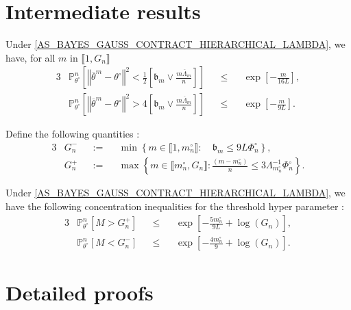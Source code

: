 \section{Intermediate results}

\begin{pr}\label{prB.1.1}
Under \textsc{\cref{AS_BAYES_GAUSS_CONTRACT_HIERARCHICAL_LAMBDA}}, we have, for all $m$ in $\llbracket 1, G_{n} \rrbracket$
\begin{alignat*}{3}
&\mathds{P}_{\theta^{\circ}}^{n}\left[\left\Vert \overline{\theta}^{m} - \theta^{\circ} \right\Vert^{2} < \frac{1}{2}\left[\mathfrak{b}_{m} \vee \frac{m \overline{\Lambda}_{m}}{n}\right]\right] &&\leq&& \exp\left[-\frac{m}{16 L}\right],\\
&\mathds{P}_{\theta^{\circ}}^{n}\left[\left\Vert \overline{\theta}^{m} - \theta^{\circ} \right\Vert^{2} > 4 \left[\mathfrak{b}_{m} \vee \frac{m \overline{\Lambda}_{m}}{n}\right]\right] &&\leq&& \exp\left[-\frac{m}{9 L}\right].
\end{alignat*}
\end{pr}

\begin{de}\label{deB.1.1}
Define the following quantities :
\begin{alignat*}{3}
& G_{n}^{-} &&:=&& \min\left\{m \in \llbracket 1, m_{n}^{\circ} \rrbracket : \quad \mathfrak{b}_{m} \leq 9 L \Phi_{n}^{\circ}\right\},\\
& G_{n}^{+} &&:=&& \max \left\{m \in \llbracket m_{n}^{\circ}, G_{n} \rrbracket : \frac{\left( m - m_{n}^{\circ} \right)}{n} \leq 3 \Lambda_{m_{n}^{\circ}}^{-1} \Phi_{n}^{\circ}\right\}.
\end{alignat*}
\end{de}

\begin{pr}\label{prB.1.2}
Under \textsc{\cref{AS_BAYES_GAUSS_CONTRACT_HIERARCHICAL_LAMBDA}}, we have the following concentration inequalities for the threshold hyper parameter :
\begin{alignat*}{3}
& \mathds{P}_{\theta^{\circ}}^{n}\left[M > G_{n}^{+}\right] &&\leq&& \exp\left[- \frac{5 m_{n}^{\circ}}{9 L} + \log \left(G_{n}\right)\right],\\
& \mathds{P}_{\theta^{\circ}}^{n}\left[M < G_{n}^{-}\right] &&\leq&& \exp\left[- \frac{4 m_{n}^{\circ}}{9} + \log \left(G_{n}\right)\right].
\end{alignat*}
\end{pr}

\section{Detailed proofs}

